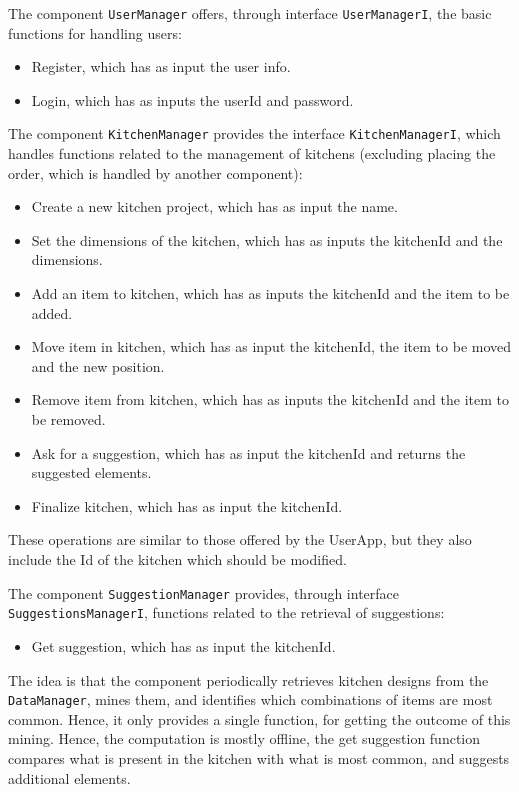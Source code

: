 The component \texttt{UserManager} offers, through interface \texttt{UserManagerI}, the basic functions for handling users:
\begin{itemize}
    \item Register, which has as input the user info. 
    \item Login, which has as inputs the userId and password. 
\end{itemize}

The component \texttt{KitchenManager} provides the interface \texttt{KitchenManagerI}, which handles functions related to the management of kitchens (excluding placing the order, which is handled by another component):
\begin{itemize}
    \item Create a new kitchen project, which has as input the name. 
    \item Set the dimensions of the kitchen, which has as inputs the kitchenId and the dimensions. 
    \item Add an item to kitchen, which has as inputs the kitchenId and the item to be added. 
    \item Move item in kitchen, which has as input the kitchenId, the item to be moved and the new position. 
    \item Remove item from kitchen, which has as inputs the kitchenId and the item to be removed. 
    \item Ask for a suggestion, which has as input the kitchenId and returns the suggested elements. 
    \item Finalize kitchen, which has as input the kitchenId. 
\end{itemize}
These operations are similar to those offered by the UserApp, but they also include the Id of the kitchen which should be modified.

The component \texttt{SuggestionManager} provides, through interface \texttt{SuggestionsManagerI}, functions related to the retrieval of suggestions:
\begin{itemize}
    \item Get suggestion, which has as input the kitchenId.
\end{itemize}
The idea is that the component periodically retrieves kitchen designs from the \texttt{DataManager}, mines them, and identifies which combinations of items are most common. 
Hence, it only provides a single function, for getting the outcome of this mining. 
Hence, the computation is mostly offline, the get suggestion function compares what is present in the kitchen with what is most common, and suggests additional elements.



